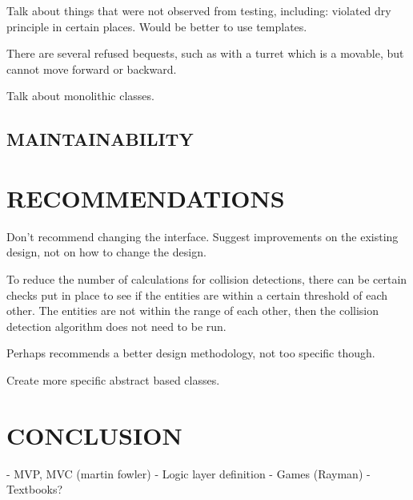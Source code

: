 \documentclass[10pt,twocolumn]{witseiepaper}
\begin{document}
Talk about things that were not observed from testing, including: violated dry principle in certain places. Would be better to use templates.

There are several refused bequests, such as with a turret which is a movable, but cannot move forward or backward.

Talk about monolithic classes.

\subsection{MAINTAINABILITY}

%
\section{RECOMMENDATIONS} %
Don't recommend changing the interface. Suggest improvements on the existing design, not on how to change the design.

To reduce the number of calculations for collision detections, there can be certain checks put in place to see if the entities are within a certain threshold of each other. The entities are not within the range of each other, then the collision detection algorithm does not need to be run.

Perhaps recommends a better design methodology, not too specific though.

Create more specific abstract based classes.




%
\section{CONCLUSION}


\balance

%



- MVP, MVC (martin fowler)
- Logic layer definition
- Games (Rayman)
- Textbooks?
\end{document}
